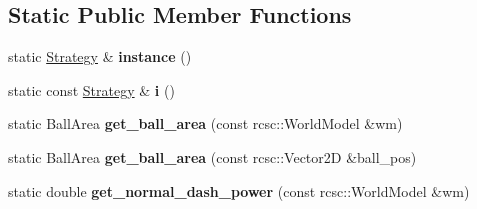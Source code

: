 \subsection*{Static Public Member Functions}
\begin{DoxyCompactItemize}
\item 
\hypertarget{classStrategy_ad3df0e2f1c88bd8133440d185e56bf3e}{
static \hyperlink{classStrategy}{Strategy} \& {\bfseries instance} ()}
\label{classStrategy_ad3df0e2f1c88bd8133440d185e56bf3e}

\item 
\hypertarget{classStrategy_a57744ca5576b9d3294700bcef202d0a2}{
static const \hyperlink{classStrategy}{Strategy} \& {\bfseries i} ()}
\label{classStrategy_a57744ca5576b9d3294700bcef202d0a2}

\item 
\hypertarget{classStrategy_a7025b56459c9c656c2229ce2583d8f4b}{
static BallArea {\bfseries get\_\-ball\_\-area} (const rcsc::WorldModel \&wm)}
\label{classStrategy_a7025b56459c9c656c2229ce2583d8f4b}

\item 
\hypertarget{classStrategy_a922b98ce680d2fd5157466b34d245e1f}{
static BallArea {\bfseries get\_\-ball\_\-area} (const rcsc::Vector2D \&ball\_\-pos)}
\label{classStrategy_a922b98ce680d2fd5157466b34d245e1f}

\item 
\hypertarget{classStrategy_a31d8f50b1cfb151d92ace4af5e001935}{
static double {\bfseries get\_\-normal\_\-dash\_\-power} (const rcsc::WorldModel \&wm)}
\label{classStrategy_a31d8f50b1cfb151d92ace4af5e001935}

\end{DoxyCompactItemize}
